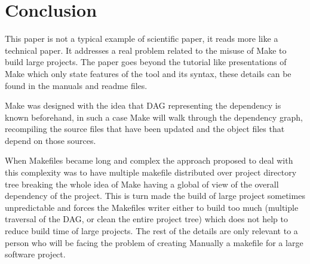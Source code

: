 \section{Conclusion}

This paper is not a typical example of scientific paper, it reads more like a
technical paper. It addresses a real problem related to the misuse of Make to build large projects. The paper 
goes beyond the tutorial like presentations of Make which only state features of the tool and its syntax,
these details can be found in the manuals and
readme files.

Make was designed with the idea that DAG representing the dependency is known beforehand, in such a case 
Make will walk through the dependency graph, recompiling the source files that have been updated and the object 
files that depend on those sources. 

When Makefiles became long and complex the approach proposed to deal with this complexity was to have multiple
makefile distributed over project directory tree breaking the whole idea of Make having a global of view of the
overall dependency of the project. This is turn made the build of large project sometimes unpredictable and 
forces the Makefiles writer either to build too much (multiple traversal of the DAG, or clean the entire project tree)
which does not help to reduce build time of large projects. The rest of the details are only relevant to a person 
who will be facing the problem of creating Manually a makefile for a large software project.